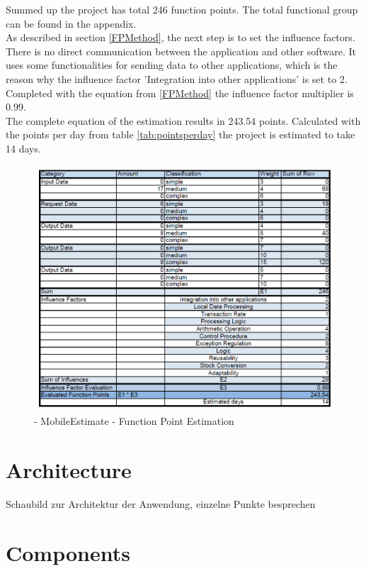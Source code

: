 Summed up the project has total 246 function points. The total functional group can be found in the appendix. \\
As described in section \ref{FPMethod}, the next step is to set the influence factors. There is no direct communication between the application and other software. It uses some functionalities for sending data to other applications, which is the reason why the influence factor 'Integration into other applications' is set to 2.
Completed with the equation from \ref{FPMethod} the influence factor multiplier is 0.99. 
\\
The complete equation of the estimation results in 243.54 points. Calculated with the points per day from table \ref{tab:pointsperday} the project is estimated to take 14 days.

\begin{figure}[h] 
	\centering 
	\includegraphics[width=14cm]{images/mobileestimatEstimation.PNG} 
	\caption{- MobileEstimate - Function Point Estimation} 
	\label{fig:projectEstimation}
\end{figure}

\section{Architecture}

Schaubild zur Architektur der Anwendung, einzelne Punkte besprechen

\section{Components}

